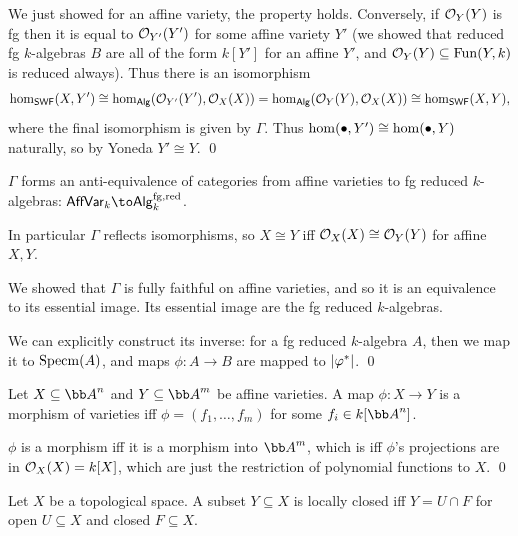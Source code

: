 \ecoro

\bproof

    We just showed for an affine variety, the property holds.
    Conversely, if ${{\cal O}}_Y(Y)$ is fg then it is equal to ${{\cal O}}_{Y'}(Y')$ for some affine variety $Y'$ (we showed that reduced fg $k$-algebras $B$ are all of the form $k[Y']$ for an
    affine $Y'$, and ${{\cal O}}_Y(Y)\subseteq{\rm Fun}(Y,k)$ is reduced always).
    Thus there is an isomorphism
    $$ \hom_{\sf SWF}(X,Y') \cong \hom_{\sf Alg}({{\cal O}}_{Y'}(Y'),{{\cal O}}_X(X)) = \hom_{\sf Alg}({{\cal O}}_Y(Y),{{\cal O}}_X(X)) \cong \hom_{\sf SWF}(X,Y) , $$
    where the final isomorphism is given by $\Gamma$.
    Thus $\hom(\bullet,Y')\cong\hom(\bullet,Y)$ naturally, so by Yoneda $Y'\cong Y$.
    \qed

\eproof

\bcoro

    $\Gamma$ forms an anti-equivalence of categories from affine varieties to fg reduced $k$-algebras: $\AVar_k\to\Alg_k^{\fg,\red}$.

    In particular $\Gamma$ reflects isomorphisms, so $X\cong Y$ iff ${{\cal O}}_X(X)\cong{{\cal O}}_Y(Y)$ for affine $X,Y$.

\ecoro

\bproof

    We showed that $\Gamma$ is fully faithful on affine varieties, and so it is an equivalence to its essential image.
    Its essential image are the fg reduced $k$-algebras.

    We can explicitly construct its inverse: for a fg reduced $k$-algebra $A$, then we map it to ${\rm Specm}(A)$, and maps $\phi\colon A\to B$ are mapped to $\mathopen{}\mathclose{\left|\varphi^*\right|}$.
    \qed

\eproof

\bcoro

    Let $X\subseteq\bA^n$ and $Y\subseteq\bA^m$ be affine varieties.
    A map $\phi\colon X\to Y$ is a morphism of varieties iff $\phi=(f_1,\dots,f_m)$ for some $f_i\in k[\bA^n]$.

\ecoro

\bproof

    $\phi$ is a morphism iff it is a morphism into $\bA^m$, which is iff $\phi$'s projections are in ${{\cal O}}_X(X)=k[X]$, which are just the restriction of polynomial functions to $X$.
    \qed

\eproof

\bdefn

    Let $X$ be a topological space.
    A subset $Y\subseteq X$ is {\emphcolor locally closed} iff $Y=U\cap F$ for open $U\subseteq X$ and closed $F\subseteq X$.

